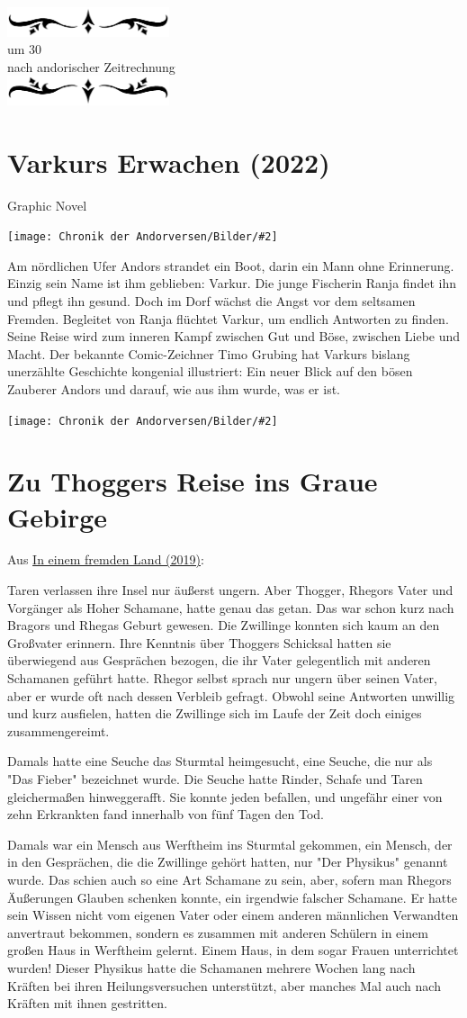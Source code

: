 \documentclass[10pt, a4paper, oneside]{book}
\newcommand{\fillbreak}{\vspace*{\fill}\columnbreak}
\newcommand{\produkt}[1]{%
    \section{#1}%
    \label{Produkt: #1}%
}
\newcommand{\refstorytext}[1]{\hyperref[Storytext: #1]{#1}}
\newcommand{\bildmitts}[2][height=0.32\textwidth,width=0.48\textwidth,keepaspectratio]{%
    \begin{center}
        \texttt{[image: Chronik der Andorversen/Bilder/\#2]}
    \end{center}
}
\newcommand{\az}[1]{%
    \begin{center}
        \includegraphics[width=180px]{Chronik der Andorversen/verzierung1.png}\\
        {\Huge #1} \\
        {nach andorischer Zeitrechnung}\\
        \includegraphics[width=180px]{Chronik der Andorversen/verzierung2.png}
    \end{center}
    \extramarks{}{#1 a.Z.}
}
\begin{document}
\begin{multicols}{2}
\fillbreak
\az{um 30}
\produkt{Varkurs Erwachen (2022)}

\begin{center}
    Graphic Novel
\end{center}

\bildmitts{Varkurs Erwachen (2022)}

Am nördlichen Ufer Andors strandet ein Boot, darin ein Mann ohne Erinnerung. Einzig sein Name ist ihm geblieben: Varkur. Die junge Fischerin Ranja findet ihn und pflegt ihn gesund. Doch im Dorf wächst die Angst vor dem seltsamen Fremden. Begleitet von Ranja flüchtet Varkur, um endlich Antworten zu finden. Seine Reise wird zum inneren Kampf zwischen Gut und Böse, zwischen Liebe und Macht. Der bekannte Comic-Zeichner Timo Grubing hat Varkurs bislang unerzählte Geschichte kongenial illustriert: Ein neuer Blick auf den bösen Zauberer Andors und darauf, wie aus ihm wurde, was er ist.

\bildmitts{Varkurs Erwachen Mächte des Meeres.jpg}



\fillbreak
\section{Zu Thoggers Reise ins Graue Gebirge}


\begin{center}
    Aus \refstorytext{In einem fremden Land (2019)}:
\end{center}


Taren verlassen ihre Insel nur äußerst ungern. Aber Thogger, Rhegors Vater und Vorgänger als Hoher Schamane, hatte genau das getan. Das war schon kurz nach Bragors und Rhegas Geburt gewesen. Die Zwillinge konnten sich kaum an den Großvater erinnern. Ihre Kenntnis über Thoggers Schicksal hatten sie überwiegend aus Gesprächen bezogen, die ihr Vater gelegentlich mit anderen Schamanen geführt hatte. Rhegor selbst sprach nur ungern über seinen Vater, aber er wurde oft nach dessen Verbleib gefragt. Obwohl seine Antworten unwillig und kurz ausfielen, hatten die Zwillinge sich im Laufe der Zeit doch einiges zusammengereimt. 

Damals hatte eine Seuche das Sturmtal heimgesucht, eine Seuche, die nur als "Das Fieber" bezeichnet wurde. Die Seuche hatte Rinder, Schafe und Taren gleichermaßen hinweggerafft. Sie konnte jeden befallen, und ungefähr einer von zehn Erkrankten fand innerhalb von fünf Tagen den Tod. 

Damals war ein Mensch aus Werftheim ins Sturmtal gekommen, ein Mensch, der in den Gesprächen, die die Zwillinge gehört hatten, nur "Der Physikus" genannt wurde. 
Das schien auch so eine Art Schamane zu sein, aber, sofern man Rhegors Äußerungen Glauben schenken konnte, ein irgendwie falscher Schamane. Er hatte sein Wissen nicht vom eigenen Vater oder einem anderen männlichen Verwandten anvertraut bekommen, sondern es zusammen mit anderen Schülern in einem großen Haus in Werftheim gelernt. Einem Haus, in dem sogar Frauen unterrichtet wurden! 
Dieser Physikus hatte die Schamanen mehrere Wochen lang nach Kräften bei ihren Heilungsversuchen unterstützt, aber manches Mal auch nach Kräften mit ihnen gestritten. 


\end{multicols}
\end{document}
